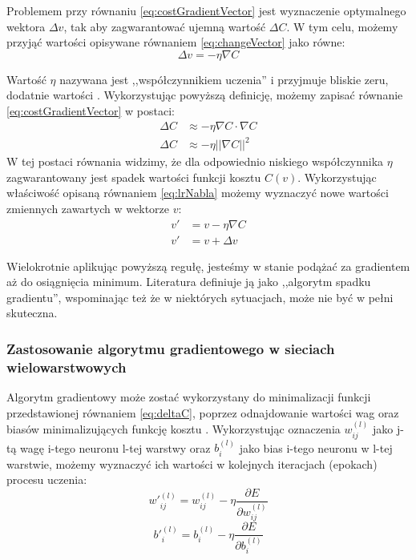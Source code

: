 \documentclass[12pt,twoside]{article}
\begin{document}
Problemem przy równaniu \ref{eq:costGradientVector} jest wyznaczenie optymalnego wektora $\Delta v$, tak aby zagwarantować ujemną wartość $\Delta C$. W tym celu, możemy \cite{nndl} przyjąć wartości opisywane równaniem \ref{eq:changeVector} jako równe:
\begin{equation}
	\label{eq:lrNabla}
	\Delta v = -\eta \nabla C
\end{equation}

Wartość $\eta$ nazywana jest ,,współczynnikiem uczenia'' i przyjmuje bliskie zeru, dodatnie wartości \cite{nndl}. Wykorzystując powyższą definicję, możemy zapisać równanie \ref{eq:costGradientVector} w postaci:
\begin{equation*}
	\begin{aligned}
		\Delta C &\approx - \eta \nabla C \cdot \nabla C\\
		\Delta C &\approx - \eta ||\nabla C||^2
	\end{aligned}
\end{equation*}
W tej postaci równania widzimy, że dla odpowiednio niskiego współczynnika $\eta$ zagwarantowany jest spadek wartości funkcji kosztu $C(v)$.
Wykorzystując właściwość opisaną równaniem \ref{eq:lrNabla} możemy \cite{nndl} wyznaczyć nowe wartości zmiennych zawartych w wektorze $v$:
\begin{equation}
	\begin{aligned}
		v' &= v - \eta \nabla C \\
		v' &= v + \Delta v
	\end{aligned}
\end{equation}

Wielokrotnie aplikując powyższą regułę, jesteśmy w stanie podążać za gradientem aż do osiągnięcia minimum.
Literatura \cite{nndl} definiuje ją jako ,,algorytm spadku gradientu'', wspominając też że w niektórych sytuacjach, może nie być w pełni skuteczna.

\subsubsection{Zastosowanie algorytmu gradientowego w sieciach wielowarstwowych}

Algorytm gradientowy może zostać wykorzystany do minimalizacji funkcji przedstawionej równaniem \ref{eq:deltaC}, poprzez odnajdowanie wartości wag oraz biasów minimalizujących funkcję kosztu \cite{nndl}.
Wykorzystując oznaczenia $w^{(l)}_{ij}$ jako j-tą wagę i-tego neuronu l-tej warstwy oraz $b^{(l)}_i$ jako bias i-tego neuronu w l-tej warstwie, możemy \cite{nndl} wyznaczyć ich wartości w kolejnych iteracjach (epokach) procesu uczenia:
\begin{equation}
	\label{eq:weightUpdate}
	{w'}^{(l)}_{ij} = w^{(l)}_{ij} - \eta \frac{\partial E}{\partial w^{(l)}_{ij}}
\end{equation}
\begin{equation}
	\label{eq:biasUpdate}
	 {b'}^{(l)}_{i} = b^{(l)}_{i} - \eta \frac{\partial E}{\partial b^{(l)}_{i}}
\end{equation}
\end{document}
